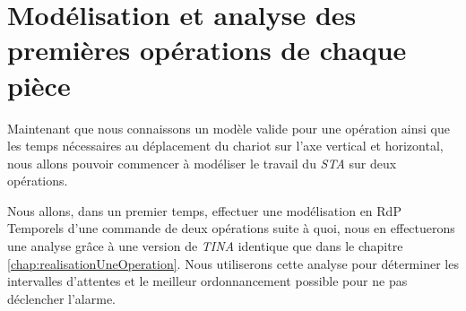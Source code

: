 \chapter{Modélisation et analyse des premières opérations de chaque pièce}
Maintenant que nous connaissons un modèle valide pour une opération ainsi que les temps nécessaires au déplacement du chariot sur l'axe vertical et horizontal, nous allons pouvoir commencer à modéliser le travail du \emph{STA} sur deux opérations.

Nous allons, dans un premier temps, effectuer une modélisation en RdP Temporels d'une commande de deux opérations suite à quoi, nous en effectuerons une analyse grâce à une version de \emph{TINA} identique que dans le chapitre \ref{chap:realisationUneOperation}. Nous utiliserons cette analyse pour déterminer les intervalles d'attentes et le meilleur ordonnancement possible pour ne pas déclencher l'alarme.

